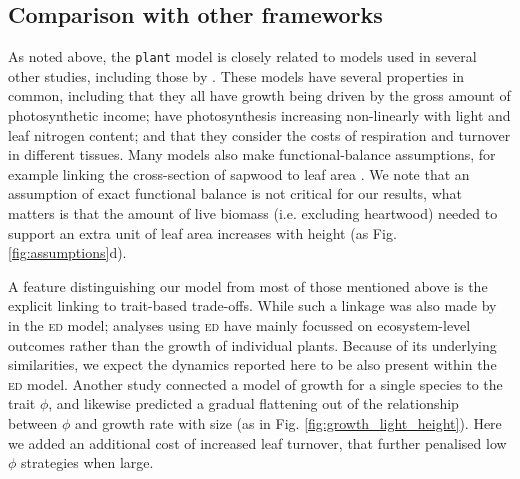 \documentclass[9pt,twocolumn,twoside]{pnas-new}
\newcommand{\plant}{\texttt{plant}}
\begin{document}
\subsection{Comparison with other frameworks}

As noted above, the {\plant} model is closely related to models used in several other studies, including those by \citep{Givnish-1988, Yokozawa-1995, Makela-1997, King-1999, King-2005, Moorcroft-2001, Li-2014}. These models have several properties in common, including that they all have growth being driven by the gross amount of photosynthetic income; have photosynthesis increasing non-linearly with light and leaf nitrogen content; and that they consider the costs of respiration and turnover in different tissues. Many models also make functional-balance assumptions, for example linking the cross-section of sapwood to leaf area \citep{Givnish-1988, Yokozawa-1995, Makela-1997, King-2005, Moorcroft-2001}. We note that an assumption of exact functional balance is not critical for our results, what matters is that the amount of live biomass (i.e. excluding heartwood) needed to support an extra unit of leaf area increases with height (as Fig. \ref{fig:assumptions}d).

A feature distinguishing our model from most of those mentioned above is the explicit linking to trait-based trade-offs. While such a linkage was also made by \citep{Moorcroft-2001} in the \textsc{ed} model; analyses using \textsc{ed} have mainly focussed on ecosystem-level outcomes rather than the growth of individual plants. Because of its underlying similarities, we expect the dynamics reported here to be also present within the \textsc{ed} model. Another study \citep{King-1999} connected a model of growth for a single species to the trait $\phi$, and likewise predicted a gradual flattening out of the relationship between $\phi$ and growth rate with size (as in Fig. \ref{fig:growth_light_height}). Here we added an additional cost of increased leaf turnover, that further penalised low $\phi$ strategies when large.
\end{document}
